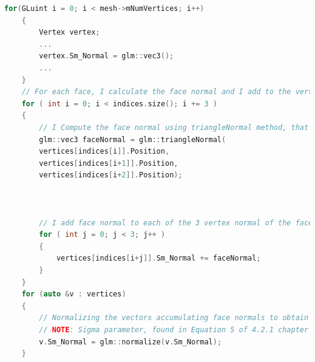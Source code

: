 \begin{lstlisting}[language=C++, caption=Smoothed normal computations added in processMesh method of model\char`_v1 file ,label={code:smoothing_model}]
	for(GLuint i = 0; i < mesh->mNumVertices; i++)
	{
		Vertex vertex;
		...
		vertex.Sm_Normal = glm::vec3();
		...
	}
	// For each face, I calculate the face normal and I add to the vertices' normal used by the face. Finally, I normalize the normal to obtain the smoothed surface normal.
	for ( int i = 0; i < indices.size(); i += 3 )
	{
		// I Compute the face normal using triangleNormal method, that computes normal starting from triangle points
		glm::vec3 faceNormal = glm::triangleNormal(
		vertices[indices[i]].Position,
		vertices[indices[i+1]].Position,
		vertices[indices[i+2]].Position);
		
		
		
		// I add face normal to each of the 3 vertex normal of the face
		for ( int j = 0; j < 3; j++ )
		{
			vertices[indices[i+j]].Sm_Normal += faceNormal;
		}
	}
	for (auto &v : vertices)
	{
		// Normalizing the vectors accumulating face normals to obtain the smoothed surface normal
		// NOTE: Sigma parameter, found in Equation 5 of 4.2.1 chapter of the reference paper ( to control the quantity of convolution kernel used ) is implicitely 1.
		v.Sm_Normal = glm::normalize(v.Sm_Normal);
	}	
\end{lstlisting}
